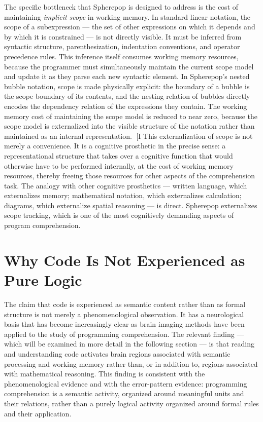 \documentclass[12pt,openany]{book}
\theoremstyle{plain}
\theoremstyle{definition}
\theoremstyle{remark}
\begin{document}
The specific bottleneck that Spherepop is designed to address is the cost of maintaining \emph{implicit scope} in working memory. In standard linear notation, the scope of a subexpression — the set of other expressions on which it depends and by which it is constrained — is not directly visible. It must be inferred from syntactic structure, parenthesization, indentation conventions, and operator precedence rules. This inference itself consumes working memory resources, because the programmer must simultaneously maintain the current scope model and update it as they parse each new syntactic element. In Spherepop's nested bubble notation, scope is made physically explicit: the boundary of a bubble is the scope boundary of its contents, and the nesting relation of bubbles directly encodes the dependency relation of the expressions they contain. The working memory cost of maintaining the scope model is reduced to near zero, because the scope model is externalized into the visible structure of the notation rather than maintained as an internal representation.
[I
This externalization of scope is not merely a convenience. It is a cognitive prosthetic in the precise sense: a representational structure that takes over a cognitive function that would otherwise have to be performed internally, at the cost of working memory resources, thereby freeing those resources for other aspects of the comprehension task. The analogy with other cognitive prosthetics — written language, which externalizes memory; mathematical notation, which externalizes calculation; diagrams, which externalize spatial reasoning — is direct. Spherepop externalizes scope tracking, which is one of the most cognitively demanding aspects of program comprehension.

\section{Why Code Is Not Experienced as Pure Logic}

The claim that code is experienced as semantic content rather than as formal structure is not merely a phenomenological observation. It has a neurological basis that has become increasingly clear as brain imaging methods have been applied to the study of programming comprehension. The relevant finding — which will be examined in more detail in the following section — is that reading and understanding code activates brain regions associated with semantic processing and working memory rather than, or in addition to, regions associated with mathematical reasoning. This finding is consistent with the phenomenological evidence and with the error-pattern evidence: programming comprehension is a semantic activity, organized around meaningful units and their relations, rather than a purely logical activity organized around formal rules and their application.
\end{document}
